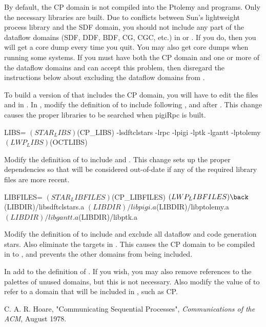 By default, the CP domain is not compiled into the Ptolemy
 and  programs.
Only the necessary libraries
are built.  Due to conflicts between Sun's lightweight process library
and the SDF domain, you should not include any part of the dataflow
domains (SDF, DDF, BDF, CG, CGC, etc.) in  or
.  If you do, then you will get a core dump every time you
quit.  You may also get core dumps when running some systems.  If you
must have both the CP domain and one or more of the dataflow domains
and can accept this problem, then disregard the instructions below
about excluding the dataflow domains from .

To build a version of  that includes the CP domain, you
will have to edit the files  and  in
.  In , modify the definition
of  to include  following
, and  after .
This change causes the proper libraries to be searched when pigiRpc is
built.

\begin{example}
LIBS=     $(STAR_LIBS) $(CP_LIBS) -lsdftclstars \back
          -lrpc -lpigi -lptk -lgantt -lptolemy \back
          $(LWP_LIBS) $(OCTLIBS)
\end{example}

Modify the definition of  to include
 and .  This change sets up
the proper dependencies so that  will be considered
out-of-date if any of the required library files are more recent.

\begin{example}
LIBFILES=  $(STAR_LIBFILES) $(CP_LIBFILES) $(LWP_LIBFILES) \back
           $(LIBDIR)/libsdftclstars.a \back
           $(LIBDIR)/libpigi.a $(LIBDIR)/libptolemy.a \back
           $(LIBDIR)/libgantt.a $(LIBDIR)/libptk.a
\end{example}

Modify the definition of  to include 
and exclude all dataflow and code generation stars.  Also eliminate the
targets in .  This causes the CP domain to be compiled
in to , and prevents the other domains from being
included.


In  add 
to the definition of .  If you wish, you may also
remove references to the palettes of unused domains, but this is not
necessary.  Also modify the value of  to refer to
a domain that will be included in  , such as CP.

C. A. R. Hoare,
"Communicating Sequential Processes",
\emph{Communications of the ACM},
August 1978.
